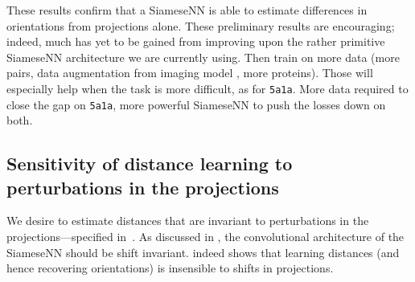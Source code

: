 These results confirm that a SiameseNN is able to estimate differences in orientations from projections alone.
These preliminary results are encouraging; indeed, much has yet to be gained from improving upon the rather primitive SiameseNN architecture we are currently using.
Then train on more data (more pairs, data augmentation from imaging model , more proteins).
Those will especially help when the task is more difficult, as for \texttt{5a1a}.
More data required to close the gap on \texttt{5a1a}, more powerful SiameseNN to push the losses down on both.


\subsection{Sensitivity of distance learning to perturbations in the projections}\label{sec:results:distance-estimation:sensitivity}



We desire to estimate distances that are invariant to perturbations in the projections---specified in~.
As discussed in , the convolutional architecture of the SiameseNN should be shift invariant.
 indeed shows that learning distances (and hence recovering orientations) is insensible to shifts in projections.

